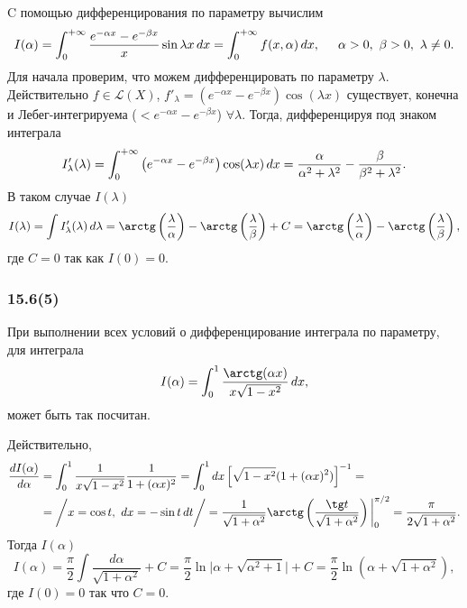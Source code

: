 C помощью дифференцирования по параметру вычислим
\begin{equation*}
    I(\alpha) = \int_0^{+\infty} \frac{e^{-\alpha x}-e^{-\beta x}}{x} \sin \lambda x \, d x = \int_0^{+\infty} f(x, \alpha) \, d x, 
    \hspace{5 mm}
    \alpha > 0, \ \beta > 0, \ \lambda \neq 0.
\end{equation*}
Для начала проверим, что можем дифференцировать по параметру $\lambda$. Действительно $f \in \mathcal L (X)$, $f'_\lambda = \left(
    e^{-\alpha x} - e^{-\beta x}
\right) \cos (\lambda x)$ существует, конечна и Лебег-интегрируема ($< e^{-\alpha x} - e^{-\beta x}$) $\forall \lambda$. Тогда, дифференцируя под знаком интеграла
\begin{equation*}
    I'_\lambda (\lambda) = \int_{0}^{+\infty}  \left(
        e^{-\alpha x} - e^{-\beta x}
    \right) \cos (\lambda x) \, d x = \frac{\alpha}{\alpha^2 + \lambda^2} - \frac{\beta}{\beta^2 + \lambda^2}.
\end{equation*}
В таком случае $I(\lambda)$
\begin{equation*}
    I(\lambda) = \int I'_\lambda (\lambda) \d \lambda = \arctg\left(
        \frac{\lambda}{\alpha}
    \right) - \arctg\left(
        \frac{\lambda}{\beta} 
    \right) + C = \arctg\left(
        \frac{\lambda}{\alpha}
    \right) - \arctg\left(
        \frac{\lambda}{\beta} 
    \right),
\end{equation*}
где $C = 0$ так как $I(0) = 0$.


\subsubsection*{15.6(5)}
При выполнении всех условий о дифференцирование интеграла по параметру, для интеграла 
\begin{equation*}
    I(\alpha) = \int_0^1 \frac{\arctg (\alpha x)}{x \sqrt{1-x^2}} \d x,
\end{equation*}
может быть так посчитан. 

Действительно,
\begin{align*}
    \frac{d I(\alpha)}{d \alpha} 
    &=
    \int_0^1 \frac{1}{x \sqrt{1-x^2}} \frac{1}{1+(\alpha x)^2} 
    = 
    \int_0^1 dx \left[
        \sqrt{1-x^2} (1+ (\alpha x)^2)
    \right]^{-1}
    = \\ &=
    \bigg/
        x = \cos t, \ d x = - \sin t \d t
    \bigg/ = \frac{1}{\sqrt{1+\alpha^2}} \arctg \l(
        \frac{\tg t}{\sqrt{1+\alpha^2}}
    \r) \bigg|_0^{\pi/2} = \frac{\pi}{2 \sqrt{1+\alpha^2}}.
\end{align*}
Тогда $I(\alpha)$
\begin{equation*}
    I(\alpha) = \frac{\pi}{2} \int \frac{d \alpha}{\sqrt{1+\alpha^2}} + C 
    = 
    \frac{\pi}{2} \ln \bigg|
        \alpha + \sqrt{\alpha^2 + 1}
    \bigg| + C = 
    \frac{\pi}{2} \ln\left(
        \alpha + \sqrt{1 + \alpha^2}
    \right)
    ,
\end{equation*}
где $I(0) = 0$ так что $C = 0$.



